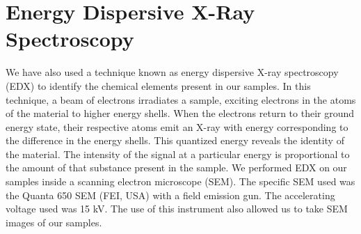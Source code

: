 \vspace{12pt}
\section{Energy Dispersive X-Ray Spectroscopy}
We have also used a technique known as energy dispersive X-ray spectroscopy (EDX) to identify the chemical elements present in our samples. In this technique, a beam of electrons irradiates a sample, exciting electrons in the atoms of the material to higher energy shells. When the electrons return to their ground energy state, their respective atoms emit an X-ray with energy corresponding to the difference in the energy shells. This quantized energy reveals the identity of the material. The intensity of the signal at a particular energy is proportional to the amount of that substance present in the sample. We performed EDX on our samples inside a scanning electron microscope (SEM). The specific SEM used was the Quanta 650 SEM (FEI, USA) with a field emission gun. The accelerating voltage used was 15 kV. The use of this instrument also allowed us to take SEM images of our samples.

